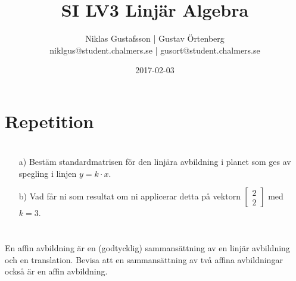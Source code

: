 \documentclass{article}
\title{SI LV3 Linjär Algebra}
\author{Niklas Gustafsson | Gustav Örtenberg  \\ \small{niklgus@student.chalmers.se} | \small{gusort@student.chalmers.se}}
\date{2017-02-03}
\begin{document}
\maketitle
\section*{Repetition}

\section{}


\section{}


\section{}


\section{}


\section{}


\section{}


\section{}
\begin{itemize}
	\item[a) ] Bestäm standardmatrisen för den linjära avbildning i planet som ges av spegling i linjen $y=k \cdot x$. 
	\item[b) ] Vad får ni som resultat om ni applicerar detta på vektorn $\begin{bmatrix}2 \\ 2\end{bmatrix}$ med $k=3$.
\end{itemize}

\section{}
En affin avbildning är en (godtycklig) sammansättning av en linjär avbildning och en
translation. Bevisa att en sammansättning av två affina avbildningar också är en affin avbildning.
\end{document}

